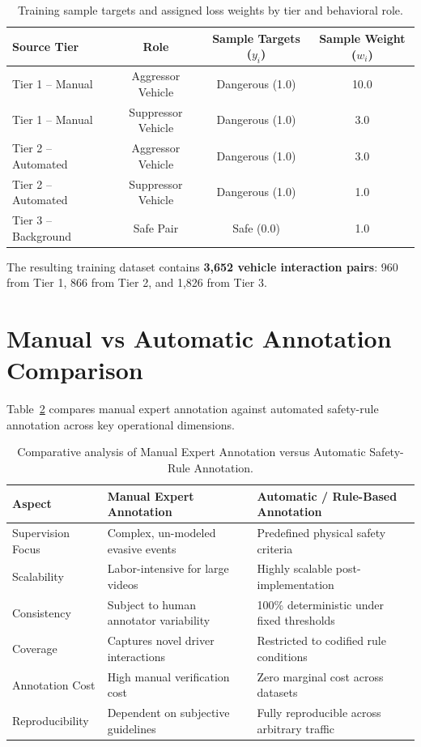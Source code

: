 \documentclass[12pt,a4paper]{report}
\begin{document}
\begin{table}[H]
\centering
\caption{Training sample targets and assigned loss weights by tier and behavioral role.}
\label{tab:weights}
\begin{tabular}{lccc}
\toprule
\textbf{Source Tier} & \textbf{Role} & \textbf{Sample Targets ($y_i$)} & \textbf{Sample Weight ($w_i$)} \\
\midrule
Tier 1 -- Manual    & Aggressor Vehicle  & Dangerous (1.0) & 10.0 \\
Tier 1 -- Manual    & Suppressor Vehicle & Dangerous (1.0) & 3.0 \\
Tier 2 -- Automated & Aggressor Vehicle  & Dangerous (1.0) & 3.0 \\
Tier 2 -- Automated & Suppressor Vehicle & Dangerous (1.0) & 1.0 \\
Tier 3 -- Background& Safe Pair          & Safe (0.0)      & 1.0 \\
\bottomrule
\end{tabular}
\end{table}

The resulting training dataset contains \textbf{3,652 vehicle interaction pairs}: 960 from Tier 1, 866 from Tier 2, and 1,826 from Tier 3.

\section{Manual vs Automatic Annotation Comparison}

Table~\ref{tab:manual_vs_auto} compares manual expert annotation against automated safety-rule annotation across key operational dimensions.

\begin{table}[H]
\centering
\small
\caption{Comparative analysis of Manual Expert Annotation versus Automatic Safety-Rule Annotation.}
\label{tab:manual_vs_auto}
\begin{tabularx}{\textwidth}{l X X}
\toprule
\textbf{Aspect} & \textbf{Manual Expert Annotation} & \textbf{Automatic / Rule-Based Annotation} \\
\midrule
Supervision Focus & Complex, un-modeled evasive events & Predefined physical safety criteria \\
Scalability       & Labor-intensive for large videos & Highly scalable post-implementation \\
Consistency       & Subject to human annotator variability & 100\% deterministic under fixed thresholds \\
Coverage          & Captures novel driver interactions & Restricted to codified rule conditions \\
Annotation Cost   & High manual verification cost & Zero marginal cost across datasets \\
Reproducibility   & Dependent on subjective guidelines & Fully reproducible across arbitrary traffic \\
\bottomrule
\end{tabularx}
\end{table}
\end{document}
